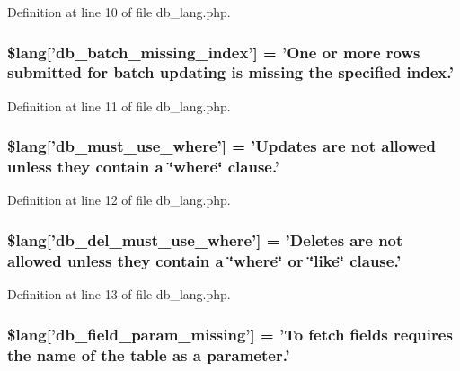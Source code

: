 Definition at line 10 of file db\-\_\-lang.\-php.

\hypertarget{db__lang_8php_af946769a3dd5679c60e6f2ef5f7a5aa1}{
\subsubsection[{\$lang}]{\setlength{\rightskip}{0pt plus 5cm}\$lang\mbox{[}'db\-\_\-batch\-\_\-missing\-\_\-index'\mbox{]} = 'One {\bf or} more rows submitted {\bf for} batch updating is missing the specified index.'}}\label{db__lang_8php_af946769a3dd5679c60e6f2ef5f7a5aa1}


Definition at line 11 of file db\-\_\-lang.\-php.

\hypertarget{db__lang_8php_add4bfc65af76fda2c48fa6a2e8d2e506}{
\subsubsection[{\$lang}]{\setlength{\rightskip}{0pt plus 5cm}\$lang\mbox{[}'db\-\_\-must\-\_\-use\-\_\-where'\mbox{]} = 'Updates are {\bf not} allowed unless they contain {\bf a} \char`\"{}where\char`\"{} clause.'}}\label{db__lang_8php_add4bfc65af76fda2c48fa6a2e8d2e506}


Definition at line 12 of file db\-\_\-lang.\-php.

\hypertarget{db__lang_8php_a256ae2de791e589ddc23012f74f390ea}{
\subsubsection[{\$lang}]{\setlength{\rightskip}{0pt plus 5cm}\$lang\mbox{[}'db\-\_\-del\-\_\-must\-\_\-use\-\_\-where'\mbox{]} = 'Deletes are {\bf not} allowed unless they contain {\bf a} \char`\"{}where\char`\"{} or \char`\"{}like\char`\"{} clause.'}}\label{db__lang_8php_a256ae2de791e589ddc23012f74f390ea}


Definition at line 13 of file db\-\_\-lang.\-php.

\hypertarget{db__lang_8php_a9101352a8cd8c8f34a6b8b1e30c45d8a}{
\subsubsection[{\$lang}]{\setlength{\rightskip}{0pt plus 5cm}\$lang\mbox{[}'db\-\_\-field\-\_\-param\-\_\-missing'\mbox{]} = 'To fetch fields requires the name of the table as {\bf a} parameter.'}}\label{db__lang_8php_a9101352a8cd8c8f34a6b8b1e30c45d8a}


